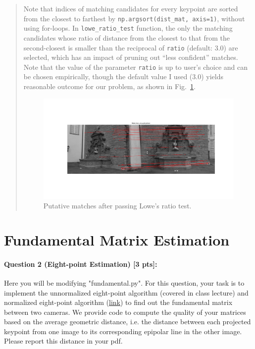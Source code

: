 \documentclass[11pt]{article}
\begin{document}
\begin{quote}
Note that indices of matching candidates for every keypoint are sorted from the closest to farthest by \texttt{np.argsort(dist\_mat, axis=1)}, without using for-loops. In \texttt{lowe\_ratio\_test} function, the only the matching candidates whose ratio of distance from the closest to that from the second-closest is smaller than the reciprocal of \texttt{ratio} (default: 3.0) are selected, which has an impact of pruning out ``less confident'' matches. Note that the value of the parameter \texttt{ratio} is up to user's choice and can be chosen empirically, though the default value I used (3.0) yields reasonable outcome for our problem, as shown in Fig.~\ref{fig:putative_matches}.

\begin{figure}[h]
    \centering
    \includegraphics[width=1.0\linewidth]{figs/putative_matches.png}
    \caption{Putative matches after passing Lowe's ratio test.}
    \label{fig:putative_matches}
\end{figure}


\end{quote}

\section*{Fundamental Matrix Estimation} 

\paragraph{Question 2 (Eight-point Estimation) [3 pts]:} Here you will be modifying "fundamental.py". For this question, your task is to implement the unnormalized eight-point algorithm (covered in class lecture) and normalized eight-point algorithm (\href{https://en.wikipedia.org/wiki/Eight-point_algorithm#Normalized_algorithm}{link}) to find out the fundamental matrix between two cameras. We provide code to compute the quality of your matrices based on the average geometric distance, i.e. the distance between each projected keypoint from one image to its corresponding epipolar line in the other image. Please report this distance in your pdf.
\end{document}
